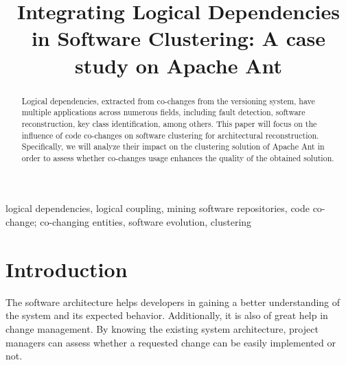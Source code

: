 \documentclass[conference, a4paper]{IEEEtran}
\begin{document}
\title{Integrating Logical Dependencies in Software Clustering: A case study on Apache Ant}

\author{
\and
{}
}

\maketitle

\begin{abstract}
Logical dependencies, extracted from co-changes from the versioning system, have multiple applications across numerous fields, including fault detection, software reconstruction, key class identification, among others. This paper will focus on the influence of code co-changes on software clustering for architectural reconstruction. Specifically, we will analyze their impact on the clustering solution of Apache Ant in order to assess whether co-changes usage enhances the quality of the obtained solution.
\end{abstract}

\begin{IEEEkeywords}
logical dependencies, logical coupling, mining software repositories, code co-change; co-changing entities, software evolution, clustering
\end{IEEEkeywords}

\section{Introduction}

The software architecture helps developers in gaining a better understanding of the system and its expected behavior. Additionally, it is also of great help in change management. By knowing the existing system architecture, project managers can assess whether a requested change can be easily implemented or not.
\end{document}
